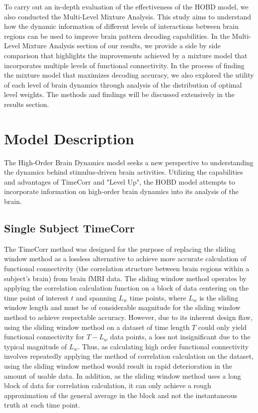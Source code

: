\documentclass[11pt]{article}
\begin{document}
To carry out an in-depth evaluation of the effectiveness of the HOBD model, we also conducted the Multi-Level Mixture Analysis. This study aims to understand how the dynamic information of different levels of interactions between brain regions can be used to improve brain pattern decoding capabilities. In the Multi-Level Mixture Analysis section of our results, we provide a side by side comparison that highlights the improvements achieved by a mixture model that incorporates multiple levels of functional connectivity. In the process of finding the mixture model that maximizes decoding accuracy, we also explored the utility of each level of brain dynamics through analysis of the distribution of optimal level weights. The methods and findings will be discussed extensively in the results section.

\newpage
\section{Model Description}
The High-Order Brain Dynamics model seeks a new perspective to understanding the dynamics behind stimulus-driven brain activities. Utilizing the capabilities and advantages of TimeCorr and "Level Up", the HOBD model attempts to incorporate information on high-order brain dynamics into its analysis of the brain.

\subsection{Single Subject TimeCorr}
The TimeCorr method was designed for the purpose of replacing the sliding window method as a lossless alternative to achieve more accurate calculation of functional connectivity (the correlation structure between brain regions within a subject's brain) from brain fMRI data. The sliding window method operates by applying the correlation calculation function on a block of data centering on the time point of interest $t$ and spanning $L_w$ time points, where $L_w$ is the sliding window length and must be of considerable magnitude for the sliding window method to achieve respectable accuracy. However, due to its inherent design flaw, using the sliding window method on a dataset of time length $T$ could only yield functional connectivity for $T-L_w$ data points, a loss not insignificant due to the typical magnitude of $L_w$. Thus, as calculating high order functional connectivity involves repeatedly applying the method of correlation calculation on the dataset, using the sliding window method would result in rapid deterioration in the amount of usable data. In addition, as the sliding window method uses a long block of data for correlation calculation, it can only achieve a rough approximation of the general average in the block and not the instantaneous truth at each time point.
\end{document}
